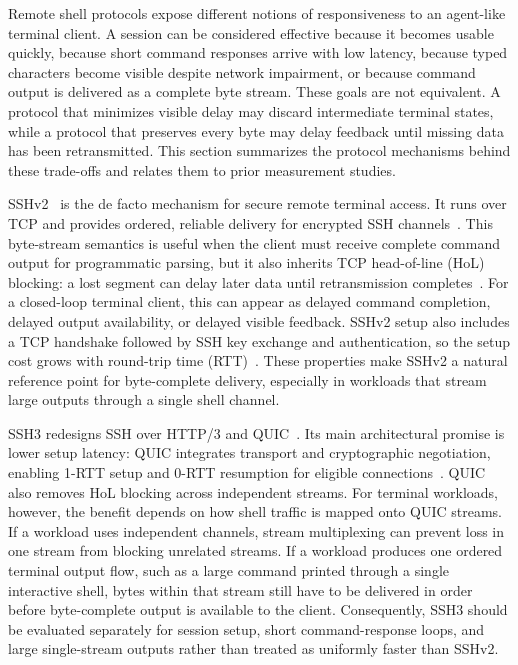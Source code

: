 Remote shell protocols expose different notions of responsiveness to an
agent-like terminal client. A session can be considered effective because it becomes usable quickly, because short command responses arrive with low
latency, because typed characters become visible despite network impairment, or because command output is delivered as a complete byte stream. These goals are not equivalent. A protocol that minimizes visible delay may discard intermediate terminal states, while a protocol that preserves every byte may delay feedback until missing data has been retransmitted. This section summarizes the protocol mechanisms behind these trade-offs and relates them to prior measurement studies.

SSHv2~\cite{Ylonen2006RFC4251} is the de facto mechanism for secure remote
terminal access. It runs over TCP and provides ordered, reliable delivery for encrypted SSH channels~\cite{Bellare2002}. This byte-stream semantics is useful when the client must receive complete command output for programmatic parsing, but it also inherits TCP head-of-line (HoL) blocking: a lost segment can delay later data until retransmission completes~\cite{Scharf2007}. For a closed-loop terminal client, this can appear as delayed command completion, delayed output availability, or delayed visible feedback. SSHv2 setup also includes a TCP handshake followed by SSH key exchange and authentication, so the setup cost grows with round-trip time (RTT)~\cite{Ylonen2006RFC4253}. These properties make SSHv2 a natural reference point for byte-complete delivery, especially in workloads that stream large outputs through a single shell channel.

SSH3 redesigns SSH over HTTP/3 and QUIC~\cite{michel2023}. Its main
architectural promise is lower setup latency: QUIC integrates transport and cryptographic negotiation, enabling 1-RTT setup and 0-RTT resumption for eligible connections~\cite{Iyengar2021}. QUIC also removes HoL blocking across independent streams. For terminal workloads, however, the benefit depends on how shell traffic is mapped onto QUIC streams. If a workload uses independent channels, stream multiplexing can prevent loss in one stream from blocking unrelated streams. If a workload produces one ordered terminal output flow, such as a large command printed through a single interactive shell, bytes within that stream still have to be delivered in order before byte-complete output is available to the client. Consequently, SSH3 should be evaluated separately for session setup, short command-response loops, and large single-stream outputs rather than treated as uniformly faster than SSHv2.

